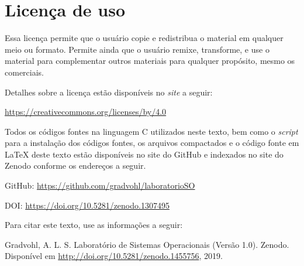 \chapter*{Licença de uso}\label{chp:licenca}
\doclicenseThis

Essa licença permite que o usuário copie e redistribua o material em qualquer meio ou formato. Permite ainda que o usuário remixe, transforme, e use o material para complementar outros materiais para qualquer propósito, mesmo os comerciais.

 Detalhes sobre a licença estão disponíveis no \textit{site} a seguir:
 \begin{center}
    \url{https://creativecommons.org/licenses/by/4.0}     
 \end{center}

Todos os códigos fontes na linguagem C utilizados neste texto, bem como o \textit{script} para a instalação dos códigos fontes, os arquivos compactados e o código fonte em \LaTeX{} deste texto estão disponíveis no site do GitHub e indexados no site do Zenodo conforme os endereços a seguir.

GitHub: \url{https://github.com/gradvohl/laboratorioSO}

DOI: \url{https://doi.org/10.5281/zenodo.1307495}

Para citar este texto, use as informações a seguir:

\noindent
{\sc Gradvohl, A. L. S.} Laboratório de Sistemas Operacionais (Versão 1.0). Zenodo. Disponível em \url{http://doi.org/10.5281/zenodo.1455756}, 2019.

